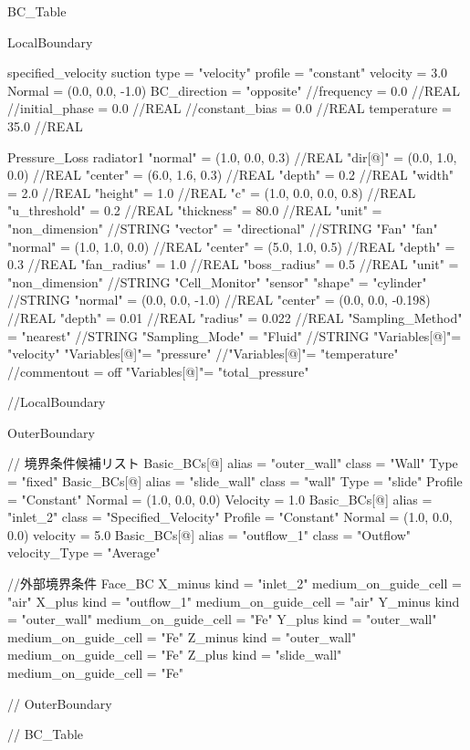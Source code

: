{\small
\begin{program}
BC_Table {

  LocalBoundary {
    specified_velocity {
      suction {
        type           = "velocity"
        profile        = "constant"
        velocity       = 3.0
        Normal         = (0.0, 0.0, -1.0)
        BC_direction   = "opposite"
        //frequency      = 0.0 //REAL
        //initial_phase  = 0.0 //REAL
        //constant_bias  = 0.0 //REAL
        temperature    = 35.0 //REAL
      }
    }

    Pressure_Loss {
      radiator1 {
        "normal" = (1.0, 0.0, 0.3) //REAL
        "dir[@]" = (0.0, 1.0, 0.0) //REAL
        "center" = (6.0, 1.6, 0.3) //REAL
        "depth" = 0.2 //REAL
        "width" = 2.0 //REAL
        "height" = 1.0 //REAL
        "c" = (1.0, 0.0, 0.0, 0.8) //REAL
        "u_threshold" = 0.2 //REAL
        "thickness" = 80.0 //REAL
        "unit" = "non_dimension" //STRING
        "vector" = "directional" //STRING
      }
    }
      "Fan"{
        "fan"{
          "normal" = (1.0, 1.0, 0.0) //REAL
          "center" = (5.0, 1.0, 0.5) //REAL
          "depth" = 0.3 //REAL
          "fan_radius" = 1.0 //REAL
          "boss_radius" = 0.5 //REAL
          "unit" = "non_dimension" //STRING
        }
      }
      "Cell_Monitor"{
        "sensor"{
          "shape" = "cylinder" //STRING
          "normal" = (0.0, 0.0, -1.0) //REAL
          "center" = (0.0, 0.0, -0.198) //REAL
          "depth" = 0.01 //REAL
          "radius" = 0.022 //REAL
          "Sampling_Method" = "nearest" //STRING
          "Sampling_Mode" = "Fluid" //STRING
          "Variables[@]"= "velocity"
          "Variables[@]"= "pressure"
          //"Variables[@]"= "temperature" //commentout = off
          "Variables[@]"= "total_pressure"
        }
      }
  } //LocalBoundary

  OuterBoundary {
      
    // 境界条件候補リスト
    Basic_BCs[@] {
      alias    = "outer_wall"
      class    = "Wall"
      Type     = "fixed"
    }
    Basic_BCs[@] {
      alias    = "slide_wall"
      class    = "wall"
      Type     = "slide"
      Profile  = "Constant"
      Normal   = (1.0, 0.0, 0.0)
      Velocity = 1.0
    }
    Basic_BCs[@] {
      alias    = "inlet_2"
      class    = "Specified_Velocity"
      Profile  = "Constant"
      Normal   = (1.0, 0.0, 0.0)
      velocity = 5.0
    }
    Basic_BCs[@] {
      alias    = "outflow_1"
      class    = "Outflow"
      velocity_Type = "Average"
    }
      
    //外部境界条件
    Face_BC {
      X_minus {
        kind   = "inlet_2"
        medium_on_guide_cell = "air"
      }
      X_plus {
        kind   = "outflow_1"
        medium_on_guide_cell = "air"
      }
      Y_minus {
        kind   = "outer_wall"
        medium_on_guide_cell = "Fe"
      }
      Y_plus {
        kind   = "outer_wall"
        medium_on_guide_cell = "Fe"
      }
      Z_minus {
        kind   = "outer_wall"
        medium_on_guide_cell = "Fe"
      }
      Z_plus {
        kind   = "slide_wall"
        medium_on_guide_cell = "Fe"
      }
    }

  } // OuterBoundary

} // BC_Table
\end{program}
}



